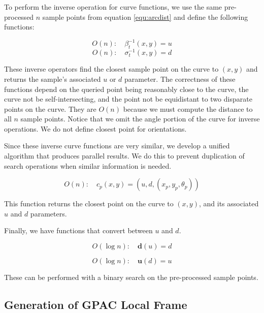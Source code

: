 To perform the inverse operation for curve functions, we use the same pre-processed $n$ sample points from equation \autoref{equ:arcdist} and define the following functions:


\begin{equation}
O(n): \quad \beta^{-1}_t(x, y) = u
\end{equation}
\begin{equation}
O(n): \quad \sigma^{-1}_t(x, y) = d
\end{equation}


These inverse operators find the closest sample point on the curve to $(x,y)$ and returns the sample's associated $u$ or $d$ parameter. The correctness of these functions depend on the queried point being reasonably close to the curve, the curve not be self-intersecting, and the point not be equidistant to two disparate points on the curve. They are $O(n)$ because we must compute the distance to all $n$ sample points. Notice that we omit the angle portion of the curve for inverse operations. We do not define closest point for orientations.

Since these inverse curve functions are very similar, we develop a unified algorithm that produces parallel results. We do this to prevent duplication of search operations when similar information is needed.


\begin{equation}
O(n): \quad c_p(x,y) = (u, d, (x_p, y_p, \theta_p) )
\end{equation}


This function returns the closest point on the curve to $(x,y)$, and its associated $u$ and $d$ parameters.

Finally, we have functions that convert between $u$ and $d$.


\begin{equation}
O(\log n): \quad \mathbf{d}(u) = d
\end{equation}



\begin{equation}
O(\log n): \quad \mathbf{u}(d) = u
\end{equation}


These can be performed with a binary search on the pre-processed sample points.

\subsection{Generation of GPAC Local Frame}
\label{generationofgpaclocalframe}


